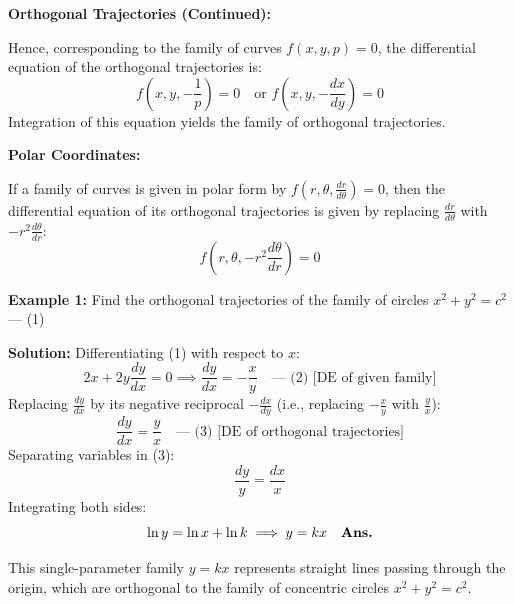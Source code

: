 \documentclass[11pt,a4paper]{article}
\newcommand{\Heading}[1]{\vspace{0.3cm}\noindent\textbf{\textcolor{AcademicGreen}{\large #1}}\par\vspace{0.15cm}}
\begin{document}
\newpage

\Heading{Orthogonal Trajectories (Continued):}
Hence, corresponding to the family of curves $f(x,y,p) = 0$, the differential equation of the orthogonal trajectories is:
\[
f\left(x, y, -\frac{1}{p}\right) = 0 \quad \text{or } f\left(x, y, -\frac{dx}{dy}\right) = 0
\]
Integration of this equation yields the family of orthogonal trajectories.

\vspace{0.3cm}
\Heading{Polar Coordinates:}
If a family of curves is given in polar form by $f\left(r, \theta, \frac{dr}{d\theta}\right) = 0$, then the differential equation of its orthogonal trajectories is given by replacing $\frac{dr}{d\theta}$ with $-r^2 \frac{d\theta}{dr}$:
\[
f\left(r, \theta, -r^2 \frac{d\theta}{dr}\right) = 0
\]

\vspace{0.3cm}
\begin{tcolorbox}[greenbox]
    \textbf{\textcolor{AcademicGreen}{Example 1:}} Find the orthogonal trajectories of the family of circles $x^2 + y^2 = c^2$ \quad --- (1)
    
    \vspace{0.15cm}
    \noindent\textbf{Solution:} Differentiating (1) with respect to $x$:
    \[
    2x + 2y \frac{dy}{dx} = 0 \implies \frac{dy}{dx} = -\frac{x}{y} \quad \text{--- (2) [DE of given family]}
    \]
    Replacing $\frac{dy}{dx}$ by its negative reciprocal $-\frac{dx}{dy}$ (i.e., replacing $-\frac{x}{y}$ with $\frac{y}{x}$):
    \[
    \frac{dy}{dx} = \frac{y}{x} \quad \text{--- (3) [DE of orthogonal trajectories]}
    \]
    Separating variables in (3):
    \[
    \frac{dy}{y} = \frac{dx}{x}
    \]
    Integrating both sides:
    \[
    \ln y = \ln x + \ln k \implies y = kx \quad \text{\textbf{Ans.}}
    \]
\end{tcolorbox}

\newpage

\noindent This single-parameter family $y = kx$ represents straight lines passing through the origin, which are orthogonal to the family of concentric circles $x^2 + y^2 = c^2$.

\vspace{0.3cm}
\begin{center}
\end{center}
\end{document}
